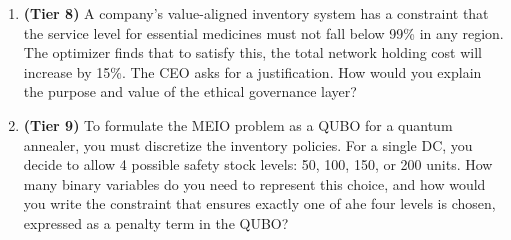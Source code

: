 \documentclass{article}
\begin{document}
\begin{enumerate}
    \item \textbf{(Tier 8)} A company's value-aligned inventory system has a constraint that the service level for essential medicines must not fall below 99\% in any region. The optimizer finds that to satisfy this, the total network holding cost will increase by 15\%. The CEO asks for a justification. How would you explain the purpose and value of the ethical governance layer?

    \item \textbf{(Tier 9)} To formulate the MEIO problem as a QUBO for a quantum annealer, you must discretize the inventory policies. For a single DC, you decide to allow 4 possible safety stock levels: 50, 100, 150, or 200 units. How many binary variables do you need to represent this choice, and how would you write the constraint that ensures exactly one of ahe four levels is chosen, expressed as a penalty term in the QUBO?
\end{enumerate}
\end{document}
